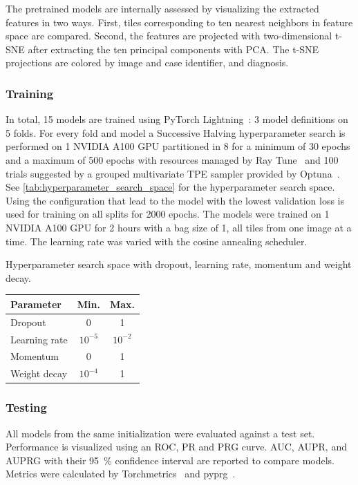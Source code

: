 The pretrained models are internally assessed by visualizing the extracted features in two ways.
First, tiles corresponding to ten nearest neighbors in feature space are compared.
Second, the features are projected with two-dimensional t-SNE after extracting the ten principal components with PCA.
The t-SNE projections are colored by image and case identifier, and diagnosis.

\subsubsection{Training}
In total, 15 models are trained using PyTorch Lightning~\cite{Falcon2019}: 3 model definitions on 5 folds.
For every fold and model a Successive Halving hyperparameter search is performed on 1 NVIDIA A100 GPU partitioned in 8 for a minimum of 30 epochs and a maximum of 500 epochs with resources managed by Ray Tune~\cite{Liaw2018} and 100 trials suggested by a grouped multivariate TPE sampler provided by Optuna~\cite{Akiba2019}.
See \cref{tab:hyperparameter_search_space} for the hyperparameter search space.
Using the configuration that lead to the model with the lowest validation loss is used for training on all splits for 2000 epochs.
The models were trained on 1 NVIDIA A100 GPU for 2 hours with a bag size of 1, \ie all tiles from one image at a time.
The learning rate was varied with the cosine annealing scheduler.

\begin{margintable}
    \caption[Hyperparameter search space]{
        Hyperparameter search space with dropout, learning rate, momentum and weight decay.
    }
    \label{tab:hyperparameter_search_space}
    \begin{tabular}{lcc}
        \toprule
        Parameter &  Min. & Max. \\
        \midrule
        Dropout & 0 & 1 \\
        Learning rate & $10^{-5}$ & $10^{-2}$ \\
        Momentum & 0 & 1 \\
        Weight decay & $10^{-4}$ & 1 \\
        \bottomrule
    \end{tabular}
\end{margintable}

\subsubsection{Testing}
All models from the same initialization were evaluated against a test set.
Performance is visualized using an ROC, PR and PRG curve.
AUC, AUPR, and AUPRG with their \qty{95}{\percent} confidence interval are reported to compare models.
Metrics were calculated by Torchmetrics~\cite{Detlefsen2022} and pyprg~\cite{Flach2015}.

